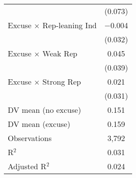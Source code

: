 \begin{center}
\begin{ThreePartTable}
\begin{longtable}{lc}
  & (0.073) \\ 
 \addlinespace 
 Excuse $\times$ Rep-leaning Ind & $-$0.004 \\ 
  & (0.032) \\ 
 \addlinespace 
 Excuse $\times$ Weak Rep & 0.045 \\ 
  & (0.039) \\ 
 \addlinespace 
 Excuse $\times$ Strong Rep & 0.021 \\ 
  & (0.031) \\ 
 \addlinespace 
DV mean (no excuse) & 0.151 \\
DV mean (excuse) & 0.159 \\
 \addlinespace 
\midrule  
Observations & 3,792 \\ 
R$^{2}$ & 0.031 \\ 
Adjusted R$^{2}$ & 0.024 \\ 
\end{longtable}
\end{ThreePartTable}
\end{center}
